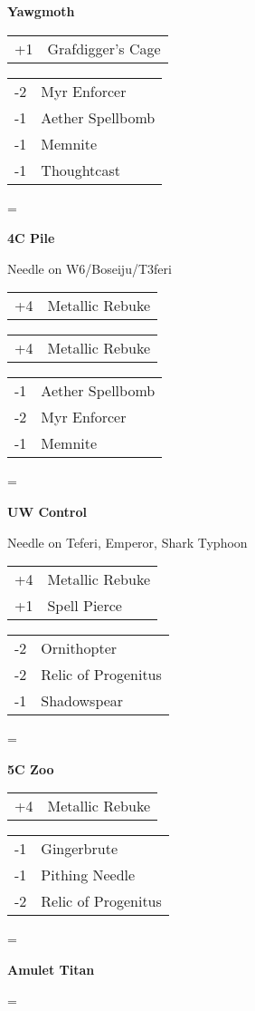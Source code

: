 \documentclass[fontsize=12pt,paper=a4]{scrartcl}
\newenvironment{absolutelynopagebreak}
  {\par\nobreak\vfil\penalty0\vfilneg
   \vtop\bgroup}
  {\par\xdef\tpd{\the\prevdepth}\egroup
   \prevdepth=\tpd}
\newenvironment{decklist}{%
    \begin{tabular}{>{\hspace{-4pt}}r<{\hspace{-3pt}}>{\hspace{-3pt}}l<{\hspace{-4pt}}}
    }{%
    \end{tabular}
    \par
}
\newcommand{\card}[2]{#1 & #2\\}
\newenvironment{sideboardguide}{%
    \newpage
    \begin{multicols}{4}
        \begin{tiny}
        }{%
        \end{tiny}
    \end{multicols}
}
\newenvironment{matchup}[1]{%
    \begin{absolutelynopagebreak}
        \textbf{#1}\par
    }{%
    \end{absolutelynopagebreak}
    \par\vspace{2em}
}
\newenvironment{notes}{%
}{%
    \par
}
\begin{document}
\begin{sideboardguide}
\begin{matchup}{Yawgmoth}
\begin{decklist}
            \card{+1}{Grafdigger's Cage}
        \end{decklist}
        \begin{decklist}
            \card{-2}{Myr Enforcer}
            \card{-1}{Aether Spellbomb}
            \card{-1}{Memnite}
            \card{-1}{Thoughtcast}
        \end{decklist}
    \end{matchup}
    \begin{matchup}{4C Pile}
        \begin{notes}
            Needle on W6/Boseiju/T3feri
        \end{notes}
        \begin{decklist}
            \card{+4}{Metallic Rebuke}
        \end{decklist}
        \begin{decklist}
            \card{+4}{Metallic Rebuke}
        \end{decklist}
        \begin{decklist}
            \card{-1}{Aether Spellbomb}
            \card{-2}{Myr Enforcer}
            \card{-1}{Memnite}
        \end{decklist}
    \end{matchup}
    \begin{matchup}{UW Control}
        \begin{notes}
            Needle on Teferi, Emperor, Shark Typhoon
        \end{notes}
        \begin{decklist}
            \card{+4}{Metallic Rebuke}
            \card{+1}{Spell Pierce}
        \end{decklist}
        \begin{decklist}
            \card{-2}{Ornithopter}
            \card{-2}{Relic of Progenitus}
            \card{-1}{Shadowspear}
        \end{decklist}
    \end{matchup}
    \begin{matchup}{5C Zoo}
        \begin{decklist}
            \card{+4}{Metallic Rebuke}
        \end{decklist}
        \begin{decklist}
            \card{-1}{Gingerbrute}
            \card{-1}{Pithing Needle}
            \card{-2}{Relic of Progenitus}
        \end{decklist}
    \end{matchup}
    \begin{matchup}{Amulet Titan}

\end{matchup}
\end{sideboardguide}
\end{document}
